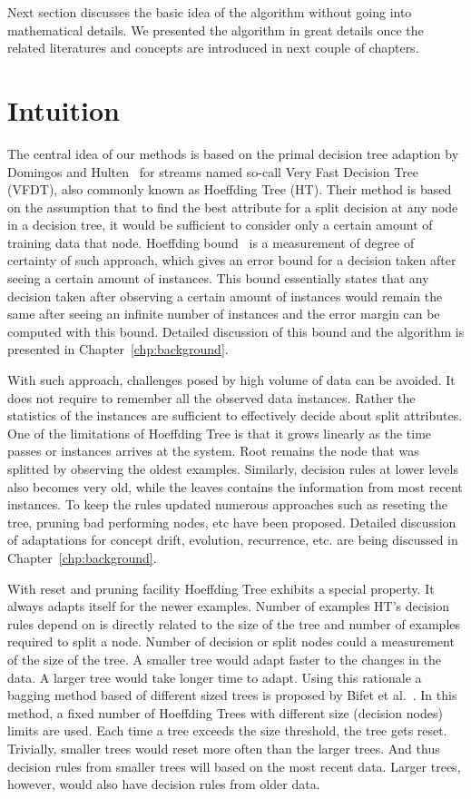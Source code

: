 Next section discusses the basic idea of the algorithm without going into mathematical details. We presented the algorithm in great details once the related literatures and concepts are introduced in next couple of chapters.

\section{Intuition}
The central idea of our methods is based on the primal decision tree adaption by Domingos and Hulten~\cite{domingos00:vfdt} for streams named so-call Very Fast Decision Tree (VFDT), also commonly known as Hoeffding Tree (HT). Their method is based on the assumption that to find the best attribute for a split decision at any node in a decision tree, it would be sufficient to consider only a certain amount of training data that node. Hoeffding bound~\cite{hoeffding63:bound} is a measurement of degree of certainty of such approach, which gives an error bound for a decision taken after seeing a certain amount of instances. This bound essentially states that any decision taken after observing a certain amount of instances would remain the same after seeing an infinite number of instances and the error margin can be computed with this bound. Detailed discussion of this bound and the algorithm is presented in Chapter~\ref{chp:background}.

With such approach, challenges posed by high volume of data can be avoided. It does not require to remember all the observed data instances. Rather the statistics of the instances are sufficient to effectively decide about split attributes. One of the limitations of Hoeffding Tree is that it grows linearly as the time passes or instances arrives at the system. Root remains the node that was splitted by observing the oldest examples. Similarly, decision rules at lower levels also becomes very old, while the leaves contains the information from most recent instances. To keep the rules updated numerous approaches such as reseting the tree, pruning bad performing nodes, etc have been proposed. Detailed discussion of adaptations for concept drift, evolution, recurrence, etc. are being discussed in Chapter~\ref{chp:background}.

With reset and pruning facility Hoeffding Tree exhibits a special property. It always adapts itself for the newer examples. Number of examples HT's decision rules depend on is directly related to the size of the tree and number of examples required to split a node. Number of decision or split nodes could a measurement of the size of the tree. A smaller tree would adapt faster to the changes in the data. A larger tree would take longer time to adapt. Using this rationale a bagging method based of different sized trees is proposed by Bifet et al.~\cite{bifet09:asht}. In this method, a fixed number of Hoeffding Trees with different size (decision nodes) limits are used. Each time a tree exceeds the size threshold, the tree gets reset. Trivially, smaller trees would reset more often than the larger trees. And thus decision rules from smaller trees will based on the most recent data. Larger trees, however, would also have decision rules from older data.

